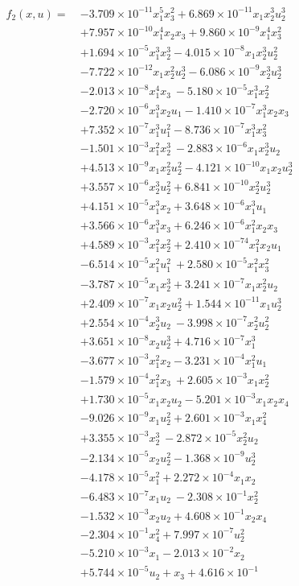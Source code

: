 \documentclass[%
 reprint,
 amsmath,amssymb,
 aps,
]{revtex4-2}
\begin{document}
\begin{align*}
f_2(x,u) = \
& -3.709\times10^{-11}x_1^5x_3^2 + 6.869\times10^{-11}x_1x_2^3u_2^3 \\
&+ 7.957\times10^{-10}x_1^4x_2 x_3 
+ 9.860\times10^{-9}x_1^4x_3^2 \\
&+ 1.694\times10^{-5}x_1^3x_2^3 - 4.015\times10^{-8}x_1x_2^3u_2^2 \\
\
& - 7.722\times10^{-12}x_1x_2^2u_2^3 - 6.086\times10^{-9}x_2^3u_2^3 \\
&- 2.013\times10^{-8}x_1^4x_3
\
- 5.180\times10^{-5}x_1^3x_2^2 \\
&- 2.720\times10^{-6}x_1^3x_2u_1 
- 1.410\times10^{-7}x_1^3x_2 x_3 \\
\
& + 7.352\times10^{-7}x_1^3u_1^2 - 8.736\times10^{-7}x_1^3x_3^2 \\
&- 1.501\times10^{-3}x_1^2x_2^3 
\
- 2.883\times10^{-6}x_1x_2^3u_2 \\
&+ 4.513\times10^{-9}x_1x_2^2u_2^2 - 4.121\times10^{-10}x_1x_2u_2^3 \\
\
& + 3.557\times10^{-6}x_2^3u_2^2 + 6.841\times10^{-10}x_2^2u_2^3 \\
&+ 4.151\times10^{-5}x_1^3x_2 + 3.648\times10^{-6}x_1^3u_1 \\
&+ 3.566\times10^{-6}x_1^3x_3 
+ 6.246\times10^{-6}x_1^2x_2 x_3 
\\
& + 4.589\times10^{-3}x_1^2x_2^2 + 2.410\times10^{-74}x_1^2x_2u_1 \\
&- 6.514\times10^{-5}x_1^2u_1^2 
\
+ 2.580\times10^{-5}x_1^2x_3^2 \\
&- 3.787\times10^{-5}x_1x_2^3 + 3.241\times10^{-7}x_1x_2^2u_2 \\
\
& + 2.409\times10^{-7}x_1x_2u_2^2 + 1.544\times10^{-11}x_1u_2^3 \\
&+ 2.554\times10^{-4}x_2^3u_2 
\
- 3.998\times10^{-7}x_2^2u_2^2 \\
&+ 3.651\times10^{-8}x_2u_2^3 + 4.716\times10^{-7}x_1^3 \\
\
& - 3.677\times10^{-3}x_1^2x_2 - 3.231\times10^{-4}x_1^2u_1 \\
&- 1.579\times10^{-4}x_1^2x_3 
\
+ 2.605\times10^{-3}x_1x_2^2 \\
&+ 1.730\times10^{-5}x_1x_2u_2 
- 5.201\times10^{-3}x_1x_2x_4 \\
\
&- 9.026\times10^{-9}x_1u_2^2 
+ 2.601\times10^{-3}x_1x_4^2 \\
&+ 3.355\times10^{-3}x_2^3 
\
- 2.872\times10^{-5}x_2^2u_2 \\
&- 2.134\times10^{-5}x_2u_2^2 
- 1.368\times10^{-9}u_2^3 \\
\
 &- 4.178\times10^{-5}x_1^2 
 + 2.272\times10^{-4}x_1x_2 \\
 &- 6.483\times10^{-7}x_1u_2 
\
- 2.308\times10^{-1}x_2^2 \\
&- 1.532\times10^{-3}x_2u_2 
+ 4.608\times10^{-1}x_2x_4 \\
\
&- 2.304\times10^{-1}x_4^2 
+ 7.997\times10^{-7}u_2^2 \\
&- 5.210\times10^{-3}x_1  - 2.013\times10^{-2}x_2 \\
&+ 5.744\times10^{-5}u_2 + x_3 
+ 4.616\times10^{-1} \tag{25}
\
\end{align*}
\end{document}
